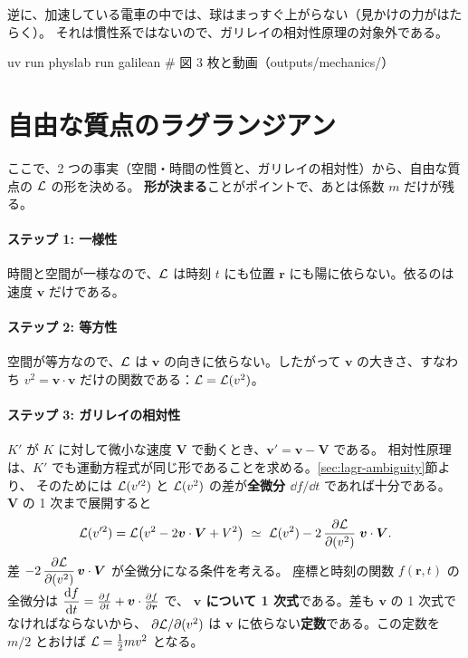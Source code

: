 逆に、加速している電車の中では、球はまっすぐ上がらない（見かけの力がはたらく）。
それは慣性系ではないので、ガリレイの相対性原理の対象外である。

\begin{simbox}
\begin{terminal}
uv run physlab run galilean      # 図 3 枚と動画（outputs/mechanics/）
\end{terminal}
\end{simbox}

\section{自由な質点のラグランジアン}\label{sec:free-lagr}

ここで、2 つの事実（空間・時間の性質と、ガリレイの相対性）から、自由な質点の $\mathcal{L}$ の形を決める。
\textbf{形が決まる}ことがポイントで、あとは係数 $m$ だけが残る。

\paragraph{ステップ 1: 一様性}
時間と空間が一様なので、$\mathcal{L}$ は時刻 $t$ にも位置 $\bm r$ にも陽に依らない。依るのは速度 $\bm v$ だけである。

\paragraph{ステップ 2: 等方性}
空間が等方なので、$\mathcal{L}$ は $\bm v$ の向きに依らない。したがって $\bm v$ の大きさ、すなわち
$v^2=\bm v\cdot\bm v$ だけの関数である：$\mathcal{L}=\mathcal{L}(v^2)$。

\paragraph{ステップ 3: ガリレイの相対性}
$K'$ が $K$ に対して微小な速度 $\bm V$ で動くとき、$\bm v'=\bm v-\bm V$ である。
相対性原理は、$K'$ でも運動方程式が同じ形であることを求める。\ref{sec:lagr-ambiguity}節より、
そのためには $\mathcal{L}(v'^2)$ と $\mathcal{L}(v^2)$ の差が\textbf{全微分 $\dd f/\dd t$} であれば十分である。
$\bm V$ の 1 次まで展開すると
\begin{equation}
  \mathcal{L}(v'^2)=\mathcal{L}\bigl(v^2-2\bm v\cdot\bm V+V^2\bigr)
  \ \simeq\ \mathcal{L}(v^2)-2\,\frac{\partial \mathcal{L}}{\partial (v^2)}\;\bm v\cdot\bm V.
\end{equation}
差 $-2\,\dfrac{\partial\mathcal{L}}{\partial(v^2)}\,\bm v\cdot\bm V$ が全微分になる条件を考える。
座標と時刻の関数 $f(\bm r,t)$ の全微分は $\dfrac{\mathrm{d} f}{\mathrm{d} t}=\frac{\partial f}{\partial t}+\bm v\cdot\frac{\partial f}{\partial \bm r}$ で、
\textbf{$\bm v$ について 1 次式}である。差も $\bm v$ の 1 次式でなければならないから、
$\partial\mathcal{L}/\partial(v^2)$ は $\bm v$ に依らない\textbf{定数}である。この定数を $m/2$ とおけば
$\mathcal{L}=\tfrac12mv^2$ となる。

